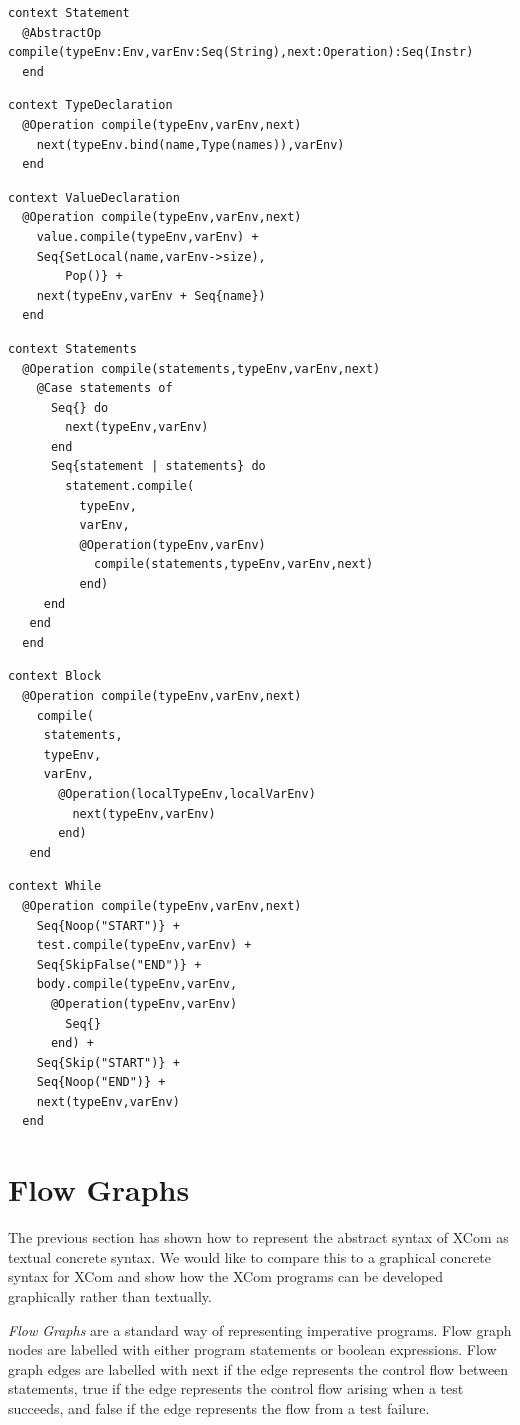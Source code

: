 \begin{lstlisting}
context Statement
  @AbstractOp compile(typeEnv:Env,varEnv:Seq(String),next:Operation):Seq(Instr)
  end
\end{lstlisting}\begin{lstlisting}
context TypeDeclaration
  @Operation compile(typeEnv,varEnv,next)
    next(typeEnv.bind(name,Type(names)),varEnv)
  end
\end{lstlisting}\begin{lstlisting}
context ValueDeclaration
  @Operation compile(typeEnv,varEnv,next)
    value.compile(typeEnv,varEnv) +
    Seq{SetLocal(name,varEnv->size),
        Pop()} +
    next(typeEnv,varEnv + Seq{name})
  end
\end{lstlisting}\begin{lstlisting}
context Statements
  @Operation compile(statements,typeEnv,varEnv,next)
    @Case statements of
      Seq{} do 
        next(typeEnv,varEnv) 
      end
      Seq{statement | statements} do 
        statement.compile(
          typeEnv,
          varEnv,
          @Operation(typeEnv,varEnv)
            compile(statements,typeEnv,varEnv,next)
          end) 
     end
   end
  end
\end{lstlisting}\begin{lstlisting}
context Block
  @Operation compile(typeEnv,varEnv,next)
    compile(
     statements,
     typeEnv,
     varEnv,
       @Operation(localTypeEnv,localVarEnv) 
         next(typeEnv,varEnv) 
       end)
   end
\end{lstlisting}\begin{lstlisting}
context While
  @Operation compile(typeEnv,varEnv,next)
    Seq{Noop("START")} +
    test.compile(typeEnv,varEnv) +
    Seq{SkipFalse("END")} +
    body.compile(typeEnv,varEnv,
      @Operation(typeEnv,varEnv) 
        Seq{} 
      end) +
    Seq{Skip("START")} +
    Seq{Noop("END")} +
    next(typeEnv,varEnv)
  end
\end{lstlisting}

\section{Flow Graphs}

The previous section has shown how to represent the abstract syntax
of XCom as textual concrete syntax. We would like to compare this
to a graphical concrete syntax for XCom and show how the XCom programs
can be developed graphically rather than textually.

\emph{Flow Graphs} are a standard way of representing imperative programs.
Flow graph nodes are labelled with either program statements or boolean
expressions. Flow graph edges are labelled with next if the edge represents
the control flow between statements, true if the edge represents the
control flow arising when a test succeeds, and false if the edge represents
the flow from a test failure.

